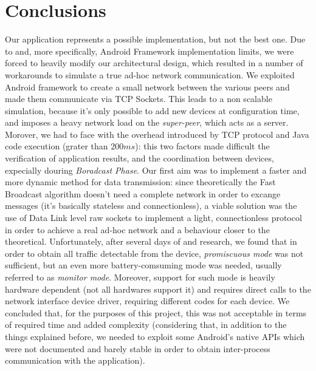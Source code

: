 \section{Conclusions}
	Our application represents a possible implementation, but not the best one. Due to \direct and, more specifically, Android \direct Framework implementation limits, we were forced to heavily modify our architectural design, which resulted in a number of workarounds to simulate a true ad-hoc network communication. We exploited Android \direct framework to create a small network between the various peers and made them communicate via TCP Sockets. This leads to a non scalable simulation, because it's only possible to add new devices at configuration time, and imposes a heavy network load on the \textit{super-peer}, which acts as a server.
	Morover, we had to face with the overhead introduced by TCP protocol and Java code execution (grater than $200ms$): this two factors made difficult the verification of application results, and the coordination between devices, expecially douring \textit{Boradcast Phase}.
	Our first aim was to implement a faster and more dynamic method for data transmission: since theoretically the Fast Broadcast algorithm doesn't need a complete network in order to excange messages (it's basically stateless and connectionless), a viable solution was the use of Data Link level raw sockets to implement a light, connectionless protocol in order to achieve a real ad-hoc network and a behaviour closer to the theoretical. Unfortunately, after several days of and research, we found that in order to obtain all traffic detectable from the device, \textit{promiscuous mode} was not sufficient, but an even more battery-comsuming mode was needed, usually referred to as \textit{monitor mode}. Moreover, support for such mode is heavily hardware dependent (not all hardwares support it) and requires direct calls to the network interface device driver, requiring different codes for each device. We concluded that, for the purposes of this project, this was not acceptable in terms of required time and added complexity (considering that, in addition to the things explained before, we needed to exploit some Android's native APIs which were not documented and barely stable in order to obtain inter-process communication with the application).
